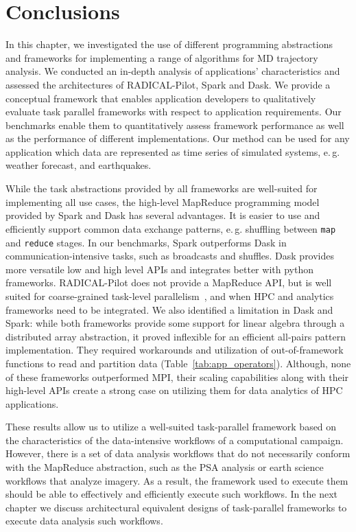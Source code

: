 \section{Conclusions}
\label{sec:tp_concl}
In this chapter, we investigated the use of different programming abstractions and frameworks for implementing a range of algorithms for MD trajectory analysis. 
We conducted an in-depth analysis of applications' characteristics and assessed the architectures of RADICAL-Pilot, Spark and Dask. 
We provide a conceptual framework that enables application developers to qualitatively evaluate task parallel frameworks with respect to application requirements. 
Our benchmarks enable them to quantitatively assess framework performance as well as the performance of different implementations. 
Our method can be used for any application which data are represented as time series of simulated systems, e.\,g. weather forecast, and earthquakes.

While the task abstractions provided by all frameworks are well-suited for implementing all use cases, the high-level MapReduce programming model provided by Spark and Dask has several advantages. 
It is easier to use and efficiently support common data exchange patterns, e.\,g. shuffling between \texttt{map} and \texttt{reduce} stages. 
In our benchmarks, Spark outperforms Dask in communication-intensive tasks, such as broadcasts and shuffles. 
Dask provides more versatile low and high level APIs and integrates better with python frameworks. 
RADICAL-Pilot does not provide a MapReduce API, but is well suited for coarse-grained task-level parallelism~\cite{merzky2018design, merzky2019using}, and when HPC and analytics frameworks need to be integrated. 
We also identified a limitation in Dask and Spark: while both frameworks provide some support for linear algebra through a distributed array abstraction, it proved inflexible for an efficient all-pairs pattern implementation. 
They required workarounds and utilization of out-of-framework functions to read and partition data (Table~\ref{tab:app_operators}). 
Although, none of these frameworks outperformed MPI, their scaling capabilities along with their high-level APIs create a strong case on utilizing them for data analytics of HPC applications.

These results allow us to utilize a well-suited task-parallel framework based on the characteristics of the data-intensive workflows of a computational campaign.
However, there is a set of data analysis workflows that do not necessarily conform with the MapReduce abstraction, such as the PSA analysis or earth science workflows that analyze imagery.
As a result, the framework used to execute them should be able to effectively and efficiently execute such workflows.
In the next chapter we discuss architectural equivalent designs of task-parallel frameworks to execute data analysis such workflows.
